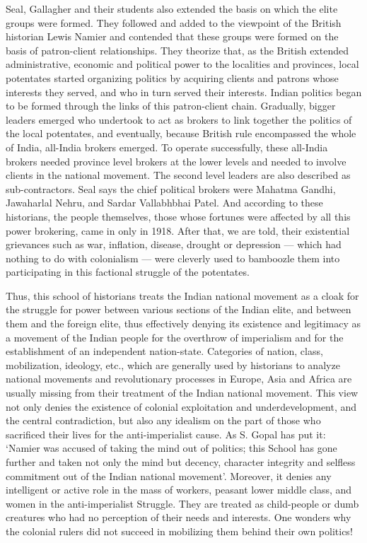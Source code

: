 \begin{multicols}{2}
Seal, Gallagher and their students also extended the basis on which the elite groups were formed. They followed and added to the viewpoint of the British historian Lewis Namier and contended that these groups were formed on the basis of patron-client relationships. They theorize that, as the British extended administrative, economic and political power to the localities and provinces, local potentates started organizing politics by acquiring clients and patrons whose interests they served, and who in turn served their interests. Indian politics began to be formed through the links of this patron-client chain. Gradually, bigger leaders emerged who undertook to act as brokers to link together the politics of the local potentates, and eventually, because British rule encompassed the whole of India, all-India brokers emerged. To operate successfully, these all-India brokers needed province level brokers at the lower levels and needed to involve clients in the national movement. The second level leaders are also described as sub-contractors. Seal says the chief political brokers were Mahatma Gandhi, Jawaharlal Nehru, and Sardar Vallabhbhai Patel. And according to these historians, the people themselves, those whose fortunes were affected by all this power brokering, came in only in 1918. After that, we are told, their existential grievances such as war, inflation, disease, drought or depression --- which had nothing to do with colonialism --- were cleverly used to bamboozle them into participating in this factional struggle of the potentates.

Thus, this school of historians treats the Indian national movement as a cloak for the struggle for power between various sections of the Indian elite, and between them and the foreign elite, thus effectively denying its existence and legitimacy as a movement of the Indian people for the overthrow of imperialism and for the establishment of an independent nation-state. Categories of nation, class, mobilization, ideology, etc., which are generally used by historians to analyze national movements and revolutionary processes in Europe, Asia and Africa are usually missing from their treatment of the Indian national movement. This view not only denies the existence of colonial exploitation and underdevelopment, and the central contradiction, but also any idealism on the part of those who sacrificed their lives for the anti-imperialist cause. As S. Gopal has put it: `Namier was accused of taking the mind out of politics; this School has gone further and taken not only the mind but decency, character integrity and selfless commitment out of the Indian national movement'. Moreover, it denies any intelligent or active role in the mass of workers, peasant lower middle class, and women in the anti-imperialist Struggle. They are treated as child-people or dumb creatures who had no perception of their needs and interests. One wonders why the colonial rulers did not succeed in mobilizing them behind their own politics!


\end{multicols}
